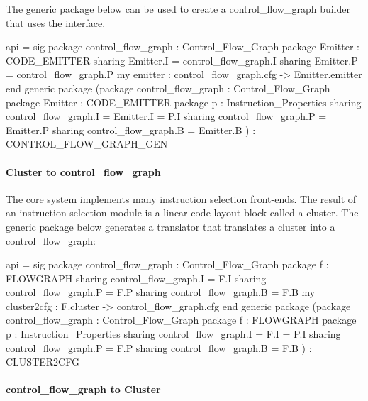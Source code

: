 The generic package  below can be
used to create a control_flow_graph builder that uses the  interface.
\begin{SML}
 api  = sig
   package control_flow_graph     : Control_Flow_Graph
   package Emitter : CODE_EMITTER
       sharing Emitter.I = control_flow_graph.I
       sharing Emitter.P = control_flow_graph.P
   my emitter : control_flow_graph.cfg -> Emitter.emitter
 end
 generic package 
    (package control_flow_graph     : Control_Flow_Graph
     package Emitter : CODE_EMITTER
     package p       : Instruction_Properties
         sharing control_flow_graph.I = Emitter.I = P.I
         sharing control_flow_graph.P = Emitter.P
         sharing control_flow_graph.B = Emitter.B
    ) : CONTROL_FLOW_GRAPH_GEN
\end{SML}

\paragraph{Cluster to control_flow_graph}

The core \MLRISC{} system implements many instruction selection
front-ends.  The result of an instruction selection module is a linear 
code layout block called a cluster.  The generic package  below 
generates a translator that translates a cluster into a control_flow_graph:
\begin{SML}
 api  = sig
   package control_flow_graph : Control_Flow_Graph
   package f   : FLOWGRAPH
      sharing control_flow_graph.I = F.I
      sharing control_flow_graph.P = F.P
      sharing control_flow_graph.B = F.B
   my cluster2cfg : F.cluster -> control_flow_graph.cfg
 end 
 generic package 
   (package control_flow_graph : Control_Flow_Graph 
    package f   : FLOWGRAPH
    package p   : Instruction_Properties
       sharing control_flow_graph.I = F.I = P.I 
       sharing control_flow_graph.P = F.P
       sharing control_flow_graph.B = F.B
   ) : CLUSTER2CFG 
\end{SML}

\paragraph{control_flow_graph to Cluster}

